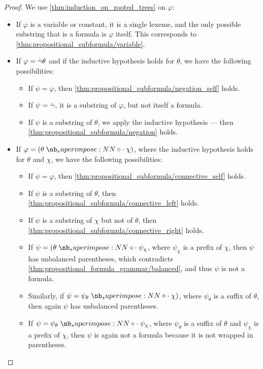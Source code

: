\begin{proof}
  We use \cref{thm:induction_on_rooted_trees} on \( \varphi \):
  \begin{itemize}
    \item If \( \varphi \) is a variable or constant, it is a single lexeme, and the only possible substring that is a formula is \( \varphi \) itself. This corresponds to \cref{thm:propositional_subformula/variable}.
    \item If \( \varphi = \dot{\neg} \theta \) and if the inductive hypothesis holds for \( \theta \), we have the following possibilities:
    \begin{itemize}
      \item If \( \psi = \varphi \), then \cref{thm:propositional_subformula/negation_self} holds.
      \item If \( \psi = \dot{\neg} \), it is a substring of \( \varphi \), but not itself a formula.
      \item If \( \psi \) is a substring of \( \theta \), we apply the inductive hypothesis --- then \cref{thm:propositional_subformula/negation} holds.
    \end{itemize}

    \item If \( \varphi = (\theta \syncirc \chi) \), where the inductive hypothesis holds for \( \theta \) and \( \chi \), we have the following possibilities:
    \begin{itemize}
      \item If \( \psi = \varphi \), then \cref{thm:propositional_subformula/connective_self} holds.
      \item If \( \psi \) is a substring of \( \theta \), then \cref{thm:propositional_subformula/connective_left} holds.
      \item If \( \psi \) is a substring of \( \chi \) but not of \( \theta \), then \cref{thm:propositional_subformula/connective_right} holds.
      \item If \( \psi = (\theta \syncirc \psi_\chi \), where \( \psi_\chi \) is a prefix of \( \chi \), then \( \psi \) has unbalanced parentheses, which contradicts \cref{thm:propositional_formula_grammar/balanced}, and thus \( \psi \) is not a formula.
      \item Similarly, if \( \psi = \psi_\theta \syncirc \chi) \), where \( \psi_\theta \) is a suffix of \( \theta \), then again \( \psi \) has unbalanced parentheses.
      \item If \( \psi = \psi_\theta \syncirc \psi_\chi \), where \( \psi_\theta \) is a suffix of \( \theta \) and \( \psi_\chi \) is a prefix of \( \chi \), then \( \psi \) is again not a formula because it is not wrapped in parentheses.
    \end{itemize}
  \end{itemize}
\end{proof}

